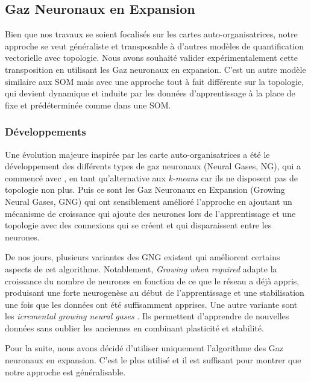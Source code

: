 	\subsection{Gaz Neuronaux en Expansion}\label{sec:sota:gng}

	Bien que nos travaux se soient focalisés sur les cartes auto-organisatrices, notre approche se veut généraliste et transposable à d'autres modèles de quantification vectorielle avec topologie. Nous avons souhaité valider expérimentalement cette transposition en utilisant les Gaz neuronaux en expansion. C'est un autre modèle similaire aux SOM mais avec une approche tout à fait différente sur la topologie, qui devient dynamique et induite par les données d'apprentissage à la place de fixe et prédéterminée comme dans une SOM. 

	\subsubsection{Développements}

	Une évolution majeure inspirée par les carte auto-organisatrices a été le développement des différents types de gaz neuronaux (Neural Gases, NG), qui a commencé avec \cite{martinetz1991neural}, en tant qu'alternative aux \textit{k-means} car ils ne disposent pas de topologie non plus. Puis ce sont les Gaz Neuronaux en Expansion (Growing Neural Gases, GNG) \cite{fritzke1995growing} qui ont sensiblement amélioré l'approche en ajoutant un mécanisme de croissance qui ajoute des neurones lors de l'apprentissage et une topologie avec des connexions qui se créent et qui disparaissent entre les neurones.

	De nos jours, plusieurs variantes des GNG existent qui améliorent certains aspects de cet algorithme. Notablement, \textit{Growing when required} \cite{marsland2002self} adapte la croissance du nombre de neurones en fonction de ce que le réseau a déjà appris, produisant une forte neurogenèse au début de l'apprentissage et une stabilisation une fois que les données ont été suffisamment apprises. Une autre variante sont les \textit{icremental growing neural gases} \cite{prudent2005incremental}. Ils permettent d'apprendre de nouvelles données sans oublier les anciennes en combinant plasticité et stabilité.

	Pour la suite, nous avons décidé d'utiliser uniquement l'algorithme des Gaz neuronaux en expansion. C'est le plus utilisé et il est suffisant pour montrer que notre approche est généralisable.

